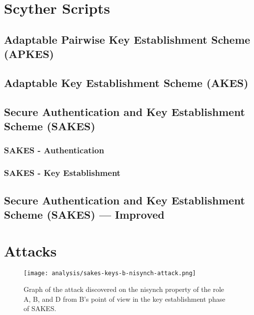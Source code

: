 \chapter{Scyther Scripts}
\label{app:listings}


\section{Adaptable Pairwise Key Establishment Scheme (APKES)}
\label{app:apkes}



\section{Adaptable Key Establishment Scheme (AKES)}
\label{app:akes}



\section{Secure Authentication and Key Establishment Scheme (SAKES)}
\label{app:sakes}

\subsection{SAKES - Authentication}
\label{app:sakes-auth}


\subsection{SAKES - Key Establishment}
\label{app:sakes-keys}
%

\section{Secure Authentication and Key Establishment Scheme (SAKES) --- Improved}
\label{app:sakes-fixed-auth}


\chapter{Attacks}


\begin{figure}[h]
	\centering
	\texttt{[image: analysis/sakes-keys-b-nisynch-attack.png]}
	\caption{Graph of the attack discovered on the nisynch property of the role A, B, and D from B's point of view in the key establishment phase of SAKES.}
	\label{fig:sakes-attack-keys-nisynch}
\end{figure}

